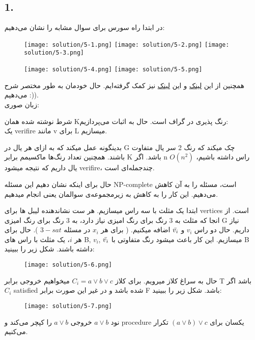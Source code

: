 \subsection*{1. }
در ابتدا راه سورس برای سوال مشابه را نشان می‌دهیم:

\begin{figure}[H]
    \centering
    \texttt{[image: solution/5-1.png]}
    \texttt{[image: solution/5-2.png]}
    \texttt{[image: solution/5-3.png]}
\end{figure}

\begin{figure}[H]
    \centering
    \texttt{[image: solution/5-4.png]}
    \texttt{[image: solution/5-5.png]}
\end{figure}

همچنین از این 
\href{https://www.geeksforgeeks.org/3-coloring-is-np-complete/}{لینک} و
این 
\href{http://cs.bme.hu/thalg/3sat-to-3col.pdf}{لینک}
نیز کمک گرفته‌ایم. حال خودمان به طور مختصر شرح می‌دهیم :)).\\

زبان صوری:
\begin{center}
\end{center}

شرط نوشته شده همان Kرنگ پذیری در گراف است.
حال به اثبات می‌پردازیم:\\
یک verifire مانند v برای L میسازیم.

بدینگونه عمل میکند که به ازای هر یال در G چک میکند که رنگ 2 سر یال متفاوت باشند.
همچنین تعداد رنگ‌ها ماکسیمم برابر K باشد.
اگر n راس داشته باشیم،
$O(n^2)$ یال داریم که نتیجه میشود verifire، چندجمله‌ای است.

حال برای اینکه نشان دهیم این مسئله NP-complete است،
مسئله  را به آن کاهش می‌دهیم. این کار را به کاهش به زیرمجموعه‌ی سوالمان یعنی 
 انجام میدهیم.

ابتدا یک مثلث با سه راس
 میسازیم. هر ست نشاندهنده لیبل ها برای 
vertices است.
از انجا که مثلث به 3 رنگ برای رنگ امیزی نیاز دارد، به 3 رنگ برای رنگ امیزی G نیاز داریم.
حال دو راس $v_i$ و $\Bar{v_i}$ اضافه میکنیم. 
( برای هر  $x_i$ در مسئله 
$3-sat$ ).
حال برای هر $i$، یک مثلث با راس های
B, $v_i$, $\Bar{v_i}$ میسازیم. این کار باعث میشود رنگ متفاوتی با B داشته باشند.
شکل زیر را ببینید:
\begin{figure}[H]
    \centering
    \texttt{[image: solution/5-6.png]}
\end{figure}
حال به سراغ کلاز میرویم.
برای کلاز 
$C_i = a \vee b \vee c$ میخواهیم 
خروجی برابر T باشد اگر 
$C_i$ satisfied شده باشد و در غیر این صورت برابر F باشد.
شکل زیر را ببینید:
\begin{figure}[H]
    \centering
    \texttt{[image: solution/5-7.png]}
\end{figure}
نود $a \vee b$ خروجی 
$a \vee b$ را کپچر می‌کند و procedure یکسان برای 
$(a \vee b) \vee c$ تکرار می‌کنیم.

